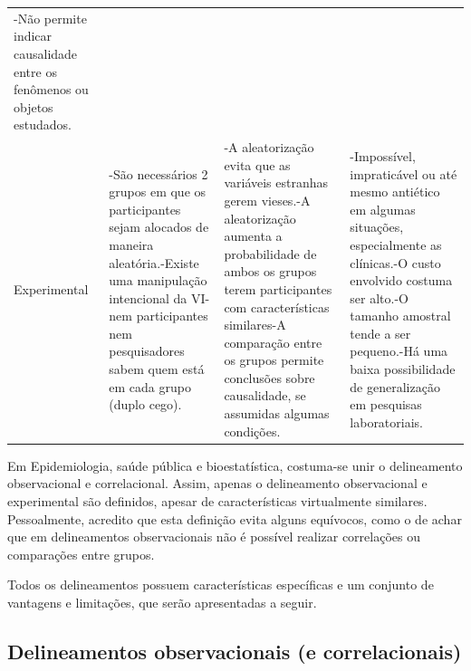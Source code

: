\documentclass[
]{book}
\begin{document}
\begin{longtable}[]{@{}llll@{}}
\begin{minipage}[t]{0.22\columnwidth}
-Não permite indicar causalidade entre os fenômenos ou objetos
estudados.\strut
\end{minipage}\tabularnewline
\begin{minipage}[t]{0.22\columnwidth}\raggedright
Experimental\strut
\end{minipage} & \begin{minipage}[t]{0.22\columnwidth}\raggedright
-São necessários 2 grupos em que os participantes sejam alocados de
maneira aleatória.-Existe uma manipulação intencional da VI-nem
participantes nem pesquisadores sabem quem está em cada grupo (duplo
cego).\strut
\end{minipage} & \begin{minipage}[t]{0.22\columnwidth}\raggedright
-A aleatorização evita que as variáveis estranhas gerem vieses.-A
aleatorização aumenta a probabilidade de ambos os grupos terem
participantes com características similares-A comparação entre os grupos
permite conclusões sobre causalidade, se assumidas algumas
condições.\strut
\end{minipage} & \begin{minipage}[t]{0.22\columnwidth}\raggedright
-Impossível, impraticável ou até mesmo antiético em algumas situações,
especialmente as clínicas.-O custo envolvido costuma ser alto.-O tamanho
amostral tende a ser pequeno.-Há uma baixa possibilidade de
generalização em pesquisas laboratoriais.\strut
\end{minipage}\tabularnewline
\bottomrule
\end{longtable}

Em Epidemiologia, saúde pública e bioestatística, costuma-se unir o
delineamento observacional e correlacional. Assim, apenas o delineamento
observacional e experimental são definidos, apesar de características
virtualmente similares. Pessoalmente, acredito que esta definição evita
alguns equívocos, como o de achar que em delineamentos observacionais
não é possível realizar correlações ou comparações entre grupos.

Todos os delineamentos possuem características específicas e um conjunto
de vantagens e limitações, que serão apresentadas a seguir.

\hypertarget{delineamentos-observacionais-e-correlacionais}{%
\subsection{Delineamentos observacionais (e
correlacionais)}\label{delineamentos-observacionais-e-correlacionais}}
\end{document}
